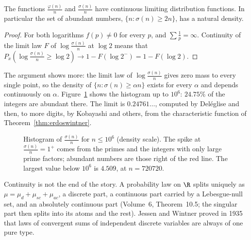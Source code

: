 \begin{corollary}\label{cor:phicont}
The functions $\frac{\varphi(n)}n$ and $\frac{\sigma(n)}n$ have continuous limiting distribution functions. In particular the set of abundant numbers, $\{n:\sigma(n)\ge2n\}$, has a natural density.
\end{corollary}
\begin{proof}
For both logarithms $f(p)\ne0$ for every $p$, and $\sum\frac1p=\infty$. Continuity of the limit law $F$ of $\log\frac{\sigma(n)}n$ at $\log2$ means that $P_x(\log\frac{\sigma(n)}n\ge\log2)\to1-F(\log2^-)=1-F(\log2)$.
\end{proof}

The argument shows more: the limit law of $\log\frac{\sigma(n)}n$ gives zero mass to every single point, so the density of $\{n:\sigma(n)\ge\alpha n\}$ exists for every $\alpha$ and depends continuously on $\alpha$. Figure~\ref{fig:sigma} shows the histogram up to $10^6$: $24.75\%$ of the integers are abundant there. The limit is $0.24761\ldots$, computed by Deléglise and then, to more digits, by Kobayashi and others, from the characteristic function of Theorem~\ref{thm:erdoswintner}.

\begin{figure}[ht]
\centering{}
\caption{Histogram of $\frac{\sigma(n)}n$ for $n\le10^6$ (density scale). The spike at $\frac{\sigma(n)}n=1^+$ comes from the primes and the integers with only large prime factors; abundant numbers are those right of the red line. The largest value below $10^6$ is $4.509$, at $n=720720$.}
\label{fig:sigma}
\end{figure}

Continuity is not the end of the story. A probability law on $\R$ splits uniquely as $\mu=\mu_d+\mu_{sc}+\mu_{ac}$, a discrete part, a continuous part carried by a Lebesgue-null set, and an absolutely continuous part (Volume~6, Theorem~10.5; the singular part then splits into its atoms and the rest). Jessen and Wintner proved in 1935 that laws of convergent sums of independent discrete variables are always of one pure type.

